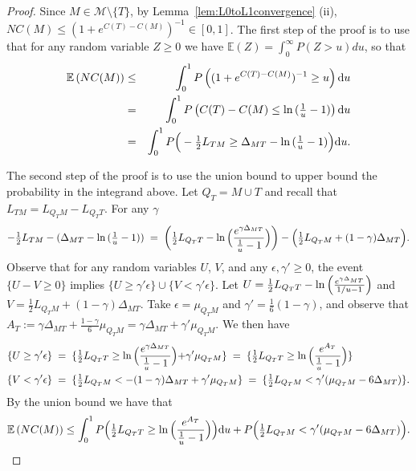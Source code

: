 \documentclass[bj,authoryear]{imsart}
\theoremstyle{plain}
\newcommand{\E}{\mathbb{E}}
\begin{document}
\begin{proof}
Since $M\in \mathcal M\setminus \{T\}$, by Lemma~\ref{lem:L0toL1convergence} (ii),  $NC(M)\leq (1+e^{C(T)-C(M)})^{-1} \in [0,1]$.  
The first step of the proof is to use that for any random variable $Z \geq 0$ we have $\E(Z)=\int_0^\infty P(Z>u) du$, so that  %
\begin{eqnarray*}
  \E\left(NC(M)\right)  &\leq& \int_0^1 P\left((1+e^{C(T)-C(M)})^{-1}\geq u\right){\rm d} u\\
  &=&\int_0^1 P\left(C(T)-C(M) \leq \ln{(\tfrac1u-1)}\right){\rm d}u\\
  &=&\int_0^1 P\Big(-\tfrac12 L_{TM} \geq \Delta_{MT}-\ln{(\tfrac1u-1)}\Big) {\rm d}u.
\end{eqnarray*}

The second step of the proof is to use the union bound to upper bound the probability in the integrand above.
Let $Q_T=M \cup T$ and recall that $L_{TM}=L_{Q_TM}-L_{Q_TT}$. For any $\gamma$ 
$$
-\tfrac12 L_{TM} -(\Delta_{MT}-\ln{(\tfrac1u-1)})\;=\;\left(\tfrac12 L_{Q_TT}-\ln{\Bigl(\frac{e^{\gamma\Delta_{MT}}}{\tfrac1u-1}\Bigl)}\right)-\Bigl(\tfrac12 L_{Q_TM}+(1-\gamma)\Delta_{MT}\Bigl).
$$
Observe that for any random variables $U$, $V$, and any $\epsilon,\gamma' \geq 0$, the event $
\{U-V \geq 0\}$ implies $\{U \geq \gamma' \epsilon\}\cup
\{V  < \gamma' \epsilon\}$. Let $U=\tfrac12 L_{Q_TT}-\ln{\Bigl(\frac{e^{\gamma\Delta_{MT}}}{1/u-1}\Bigl)}$ and $V=\tfrac12 L_{Q_TM}+(1-\gamma)\Delta_{MT}$. Take $\epsilon=\mu_{Q_TM}$ and $\gamma'=\tfrac16({1-\gamma})$, and observe that
$A_T:=\gamma\Delta_{MT}+\tfrac{1-\gamma}{6}\mu_{Q_TM}= \gamma\Delta_{MT}+\gamma'\mu_{Q_TM}$. We then have
\begin{align*}
\{U\geq \gamma'\epsilon\}\;&=\;\{\tfrac12 L_{Q_TT}\geq \ln{\Bigl(\frac{e^{\gamma\Delta_{MT}}}{\tfrac1u-1}}\Bigl)+\gamma'\mu_{Q_TM}\}\;=\;\{\tfrac12 L_{Q_TT}\geq \ln{\Bigl(\frac{e^{A_T}}{\tfrac1u-1}}\Bigl)\}\\
\{V<\gamma'\epsilon\}\;&=\;\{\tfrac12 L_{Q_TM}<-(1-\gamma)\Delta_{MT}+\gamma'\mu_{Q_TM}\}\;=\;\{\tfrac12 L_{Q_TM}<\gamma'(\mu_{Q_TM}-6\Delta_{MT})\}.
\end{align*}
By the union bound we have that
\begin{equation}\label{eq:prooflemmas20nonspu}
    \E\left(NC(M)\right)  \leq \int_0^1P\Bigl(\tfrac12 L_{Q_TT}\geq \ln{\Bigl(\frac{e^{A_T}}{\tfrac1u-1}\Bigl)}\Bigl){\rm d}u+ P\Bigl(\tfrac12 L_{Q_TM}<\gamma'(\mu_{Q_TM}-6\Delta_{MT})\Bigl).
\end{equation}


\end{proof}
\end{document}
